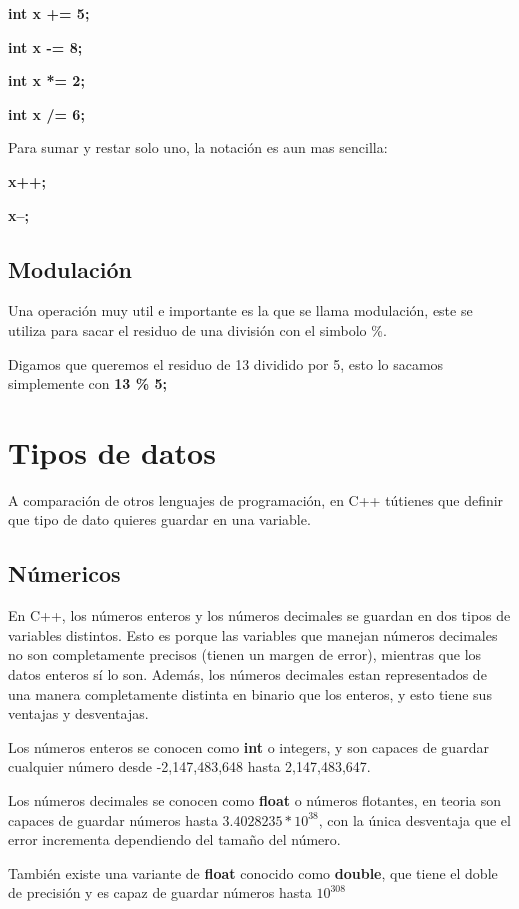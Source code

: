 \documentclass{article}
\begin{document}
\textbf{int x += 5;}

\textbf{int x -= 8;}

\textbf{int x *= 2;}

\textbf{int x /= 6;}

Para sumar y restar solo uno, la notación es aun mas sencilla:

\textbf{x++;}

\textbf{x--;}

\subsection{Modulación}

Una operación muy util e importante es la que se llama modulación, este se utiliza para sacar el residuo de una división con el simbolo \%.

Digamos que queremos el residuo de 13 dividido por 5, esto lo sacamos simplemente con \textbf{13 \% 5;}

\section{Tipos de datos}

A comparación de otros lenguajes de programación, en C++ tútienes que definir que tipo de dato quieres guardar en una variable.

\subsection{Númericos}

En C++, los números enteros y los números decimales se guardan en dos tipos de variables distintos. Esto es porque las variables que manejan números decimales no son completamente precisos (tienen un margen de error), mientras que los datos enteros sí lo son. Además, los números decimales estan representados de una manera completamente distinta en binario que los enteros, y esto tiene sus ventajas y desventajas.

Los números enteros se conocen como \textbf{int} o integers, y son capaces de guardar cualquier número desde -2,147,483,648 hasta 2,147,483,647.

Los números decimales se conocen como \textbf{float} o números flotantes, en teoria son capaces de guardar números hasta $3.4028235*10^{38}$, con la única desventaja que el error incrementa dependiendo del tamaño del número.

También existe una variante de \textbf{float} conocido como \textbf{double}, que tiene el doble de precisión y es capaz de guardar números hasta $10^{308}$
\end{document}
